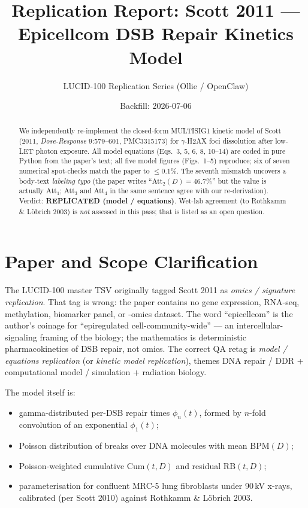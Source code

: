 \documentclass[11pt]{article}
\title{Replication Report: Scott 2011 --- Epicellcom DSB Repair Kinetics Model}
\author{LUCID-100 Replication Series (Ollie / OpenClaw)}
\date{Backfill: 2026-07-06}
\begin{document}
\maketitle

\begin{abstract}
We independently re-implement the closed-form MULTISIG1 kinetic model of Scott
(2011, \emph{Dose-Response} 9:579--601, PMC3315173) for $\gamma$-H2AX foci
dissolution after low-LET photon exposure. All model equations (Eqs.~3, 5, 6, 8,
10--14) are coded in pure Python from the paper's text; all five model figures
(Figs.~1--5) reproduce; six of seven numerical spot-checks match the paper to
$\leq 0.1\%$. The seventh mismatch uncovers a body-text \emph{labeling typo}
(the paper writes ``Att$_2(D) = 46.7\%$'' but the value is actually Att$_1$;
Att$_3$ and Att$_4$ in the same sentence agree with our re-derivation).
Verdict: \textbf{REPLICATED (model / equations)}. Wet-lab agreement (to
Rothkamm \& L\"obrich 2003) is \emph{not} assessed in this pass; that is
listed as an open question.
\end{abstract}

\section{Paper and Scope Clarification}
The LUCID-100 master TSV originally tagged Scott 2011 as \emph{omics /
signature replication}. That tag is wrong: the paper contains no gene
expression, RNA-seq, methylation, biomarker panel, or -omics dataset. The word
``epicellcom'' is the author's coinage for ``epiregulated
cell-community-wide'' --- an intercellular-signaling framing of the biology;
the mathematics is deterministic pharmacokinetics of DSB repair, not omics.
The correct QA retag is \emph{model / equations replication} (or
\emph{kinetic model replication}), themes DNA repair / DDR + computational
model / simulation + radiation biology.

The model itself is:
\begin{itemize}
  \item gamma-distributed per-DSB repair times $\phi_n(t)$, formed by
        $n$-fold convolution of an exponential $\phi_1(t)$;
  \item Poisson distribution of breaks over DNA molecules with mean BPM$(D)$;
  \item Poisson-weighted cumulative Cum$(t,D)$ and residual RB$(t,D)$;
  \item parameterisation for confluent MRC-5 lung fibroblasts under 90\,kV
        x-rays, calibrated (per Scott 2010) against Rothkamm \& L\"obrich 2003.
\end{itemize}
\end{document}

